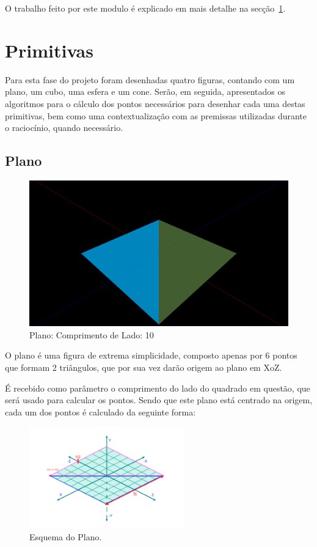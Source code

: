 \documentclass[a4paper]{article}
\begin{document}
O trabalho feito por este modulo é explicado em mais detalhe na secção~\ref{sec:primitivas}.

\section{Primitivas}\label{sec:primitivas}

Para esta fase do projeto foram desenhadas quatro figuras, contando com um plano, um cubo, uma esfera e um cone. Serão, em seguida, apresentados os algoritmos para o cálculo dos pontos necessários para desenhar cada uma destas primitivas, bem como uma contextualização com as premissas utilizadas durante o raciocínio, quando necessário.

\subsection{Plano}
\begin{figure}[H]
    \centering
    \includegraphics[width=\textwidth]{plane.png}
    \caption{Plano: Comprimento de Lado: 10}
\end{figure}

O plano é uma figura de extrema simplicidade, composto apenas por 6 pontos que formam 2 triângulos, que por sua vez darão origem ao plano em XoZ.


É recebido como parâmetro o comprimento do lado do quadrado em questão, que será usado para calcular os pontos. Sendo que este plano está centrado na origem, cada um dos pontos é calculado da seguinte forma:

\begin{figure}[H]
    \centering
    \includegraphics[width=0.6\textwidth]{esquemaPlano.PNG}
    \caption{Esquema do Plano.}
\end{figure}
\end{document}
